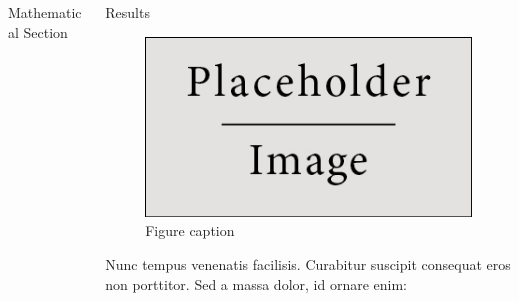 \documentclass[final]{beamer}
\newlength{\onecolwid}
\newlength{\twocolwid}
\begin{document}
\begin{frame}[t]
\begin{columns}[t]
\begin{column}{\twocolwid}
\begin{columns}[t,totalwidth=\twocolwid]
\begin{column}{\onecolwid}
\begin{block}{Mathematical Section}
                    \end{block}


                \end{column} %

                \begin{column}{\onecolwid} %


                    \begin{block}{Results}

                        \begin{figure}
                            \includegraphics[width=0.8\linewidth]{placeholder.jpg}
                            \caption{Figure caption}
                        \end{figure}

                        Nunc tempus venenatis facilisis. Curabitur suscipit consequat eros non porttitor. Sed a massa dolor, id ornare enim:


\end{block}
\end{column}
\end{columns}
\end{column}
\end{columns}
\end{frame}
\end{document}
